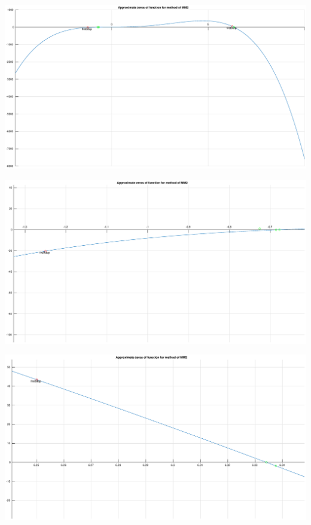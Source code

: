 \documentclass[12pt]{report}
\begin{document}
\begin{center}
   \includegraphics[scale=0.25]{task2mm2overall.eps}
\end{center}

\begin{center}
   \includegraphics[scale=0.25]{task2mm2zommedleft.eps}
\end{center}

\begin{center}
   \includegraphics[scale=0.25]{task2mm2zommedright.eps}
\end{center}
\end{document}
